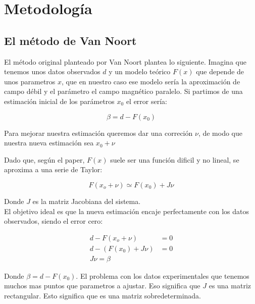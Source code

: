 
\section{Metodología}

\subsection{El método de Van Noort}
El método original planteado por Van Noort plantea lo siguiente. Imagina que tenemos unos datos observados $d$ y un modelo teórico $F(x)$ que depende de unos parametros $x$, que en nuestro caso ese modelo sería la aproximación de campo débil y el parámetro el campo magnético paralelo. Si partimos de una estimación inicial de los parámetros $x_0$ el error sería:

\begin{equation}
    \label{eq:beta}
    \beta = d -F(x_0)
\end{equation}

Para mejorar nuestra estimación queremos dar una correción $\nu$, de modo que nuestra nueva estimación sea $x_0 + \nu$

Dado que, según el paper, $F(x)$ suele ser una función dificil y no lineal, se aproxima a una serie de Taylor:

\begin{equation}
    F(x_o + \nu) \simeq F(x_0) + J \nu
\end{equation}

Donde $J$ es la matriz Jacobiana del sistema. \\

El objetivo ideal es que la nueva estimación encaje perfectamente con los datos observados, siendo el error cero:

\begin{equation}
    \begin{split}
        d - F(x_o + \nu) &= 0\\
        d - (F(x_0) + J \nu) &= 0\\
        J \nu = \beta
    \end{split}
\end{equation}

Donde $\beta = d - F(x_0)$. El problema con los datos experimentales que tenemos muchos mas puntos que parametros a ajustar. Eso significa que $J$ es una matriz rectangular. Esto significa que es una matriz sobredeterminada. \\

